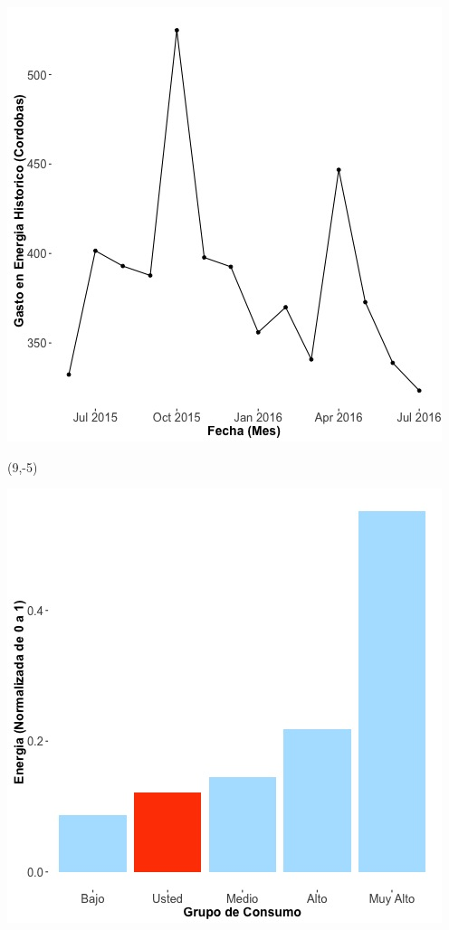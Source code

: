\documentclass{article}\usepackage[]{graphicx}\usepackage[]{color}
\newenvironment{knitrout}{}{} %
\begin{document}
\begin{knitrout}
\color{fgcolor}
\includegraphics[scale=0.65]{figure/A22_historico_cordobas} 
\end{knitrout}

 \begin{textblock}{1}(9,-5)
\begin{minipage}{20em}
\begingroup

\endgroup
\end{minipage}
\end{textblock}


\begin{knitrout}
\color{fgcolor}
\includegraphics[scale=0.65]{figure/A22_neighbor_plot} 
\end{knitrout}
\end{document}
